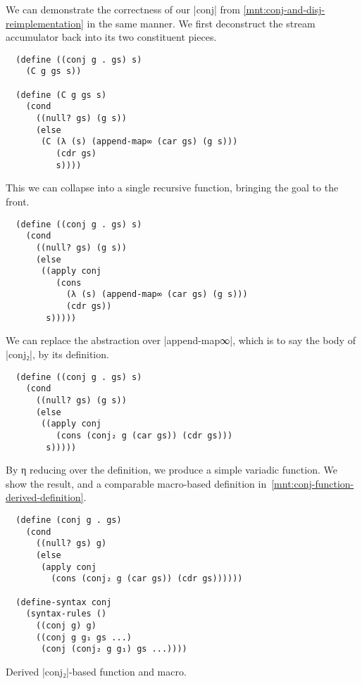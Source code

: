 \documentclass[sigplan,screen,draft,anonymous,review,natbib=false]{acmart}
\begin{document}
We can demonstrate the correctness of our \rackinline|conj| from
\cref{mnt:conj-and-disj-reimplementation} in the same manner. We first
deconstruct the stream accumulator back into its two constituent
pieces.

\begin{verbatim}
  (define ((conj g . gs) s)
    (C g gs s))

  (define (C g gs s)
    (cond
      ((null? gs) (g s))
      (else
       (C (λ (s) (append-map∞ (car gs) (g s)))
          (cdr gs)
          s))))
\end{verbatim}

\noindent This we can collapse into a single recursive function,
bringing the goal to the front.

\begin{verbatim}
  (define ((conj g . gs) s)
    (cond
      ((null? gs) (g s))
      (else
       ((apply conj
          (cons
            (λ (s) (append-map∞ (car gs) (g s)))
            (cdr gs))
        s)))))
\end{verbatim}

\noindent We can replace the abstraction over
\rackinline|append-map∞|, which is to say the body of
\rackinline|conj₂|, by its definition.

\begin{verbatim}
  (define ((conj g . gs) s)
    (cond
      ((null? gs) (g s))
      (else
       ((apply conj
          (cons (conj₂ g (car gs)) (cdr gs)))
        s)))))
\end{verbatim}

\noindent By η reducing over the definition, we produce a simple
variadic function. We show the result, and a comparable macro-based
definition in~\cref{mnt:conj-function-derived-definition}.

\begin{listing}
\begin{verbatim}
  (define (conj g . gs)
    (cond
      ((null? gs) g)
      (else
       (apply conj
         (cons (conj₂ g (car gs)) (cdr gs))))))

  (define-syntax conj
    (syntax-rules ()
      ((conj g) g)
      ((conj g g₁ gs ...)
       (conj (conj₂ g g₁) gs ...))))
\end{verbatim}
  \caption{Derived \rackinline|conj₂|-based function and macro.}
  \label{mnt:conj-function-derived-definition}
\end{listing}
\end{document}
